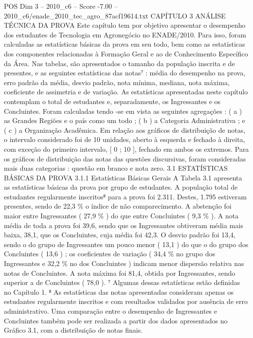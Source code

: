 \begin{textsample}{POS Dim 3 – 2010\_c6 – Score -7.00 – 2010\_c6/enade\_2010\_tec\_agro\_87acf19614.txt}  \label{ex:f3_pos_271}
CAPÍTULO 3 ANÁLISE TÉCNICA DA PROVA Este capítulo tem por objetivo apresentar o desempenho dos estudantes de Tecnologia em Agronegócio no ENADE/2010.
Para isso, foram calculadas as estatísticas básicas da prova em seu todo, bem como as estatísticas dos componentes relacionadas à Formação Geral e ao de Conhecimento Específico da Área.
Nas tabelas, são apresentados o tamanho da população inscrita e de presentes, e as seguintes estatísticas das notas⁷ : média do desempenho na prova, erro padrão da média, desvio padrão, nota mínima, mediana, nota máxima, coeficiente de assimetria e de variação.
As estatísticas apresentadas neste capítulo contemplam o total de estudantes e, separadamente, os Ingressantes e os Concluintes.
Foram calculadas tendo -se em vista as seguintes agregações : ( a ) as Grandes Regiões e o país como um todo ; ( b ) a Categoria Administrativa ; e ( c ) a Organização Acadêmica.
Em relação aos gráficos de distribuição de notas, o intervalo considerado foi de 10 unidades, aberto à esquerda e fechado à direita, com exceção do primeiro intervalo, [ 0 ; 10 ], fechado em ambos os extremos.
Para os gráficos de distribuição das notas das questões discursivas, foram consideradas mais duas categorias : questão em branco e nota zero. 3.1 ESTATÍSTICAS BÁSICAS DA PROVA 3.1.1 Estatísticas Básicas Gerais A Tabela 3.1 apresenta as estatísticas básicas da prova por grupo de estudantes.
A população total de estudantes regularmente inscritos⁸ para a prova foi 2.311.
Destes, 1.795 estiveram presentes, sendo de 22,3 \% o índice de não comparecimento.
A abstenção foi maior entre Ingressantes ( 27,9 \% ) do que entre Concluintes ( 9,3 \% ).
A nota média de toda a prova foi 39,6, sendo que os Ingressantes obtiveram média mais baixa, 38,1, que os Concluintes, cuja média foi 42,3.
O desvio padrão foi 13,4, sendo o do grupo de Ingressantes um pouco menor ( 13,1 ) do que o do grupo dos Concluintes ( 13,6 ) ; os coeficientes de variação ( 34,4 \% no grupo dos Ingressantes e 32,2 \% no dos Concluintes ) indicam menor dispersão relativa nas notas de Concluintes.
A nota máxima foi 81,4, obtida por Ingressantes, sendo superior a de Concluintes ( 78,0 ). ⁷ Algumas dessas estatísticas estão definidas no Capítulo 1. ⁸ As estatísticas das notas apresentadas consideram apenas os estudantes regularmente inscritos e com resultados validados por ausência de erro administrativo.
Uma comparação entre o desempenho de Ingressantes e Concluintes também pode ser realizada a partir dos dados apresentados no Gráfico 3.1, com a distribuição de notas finais.

\end{textsample}
